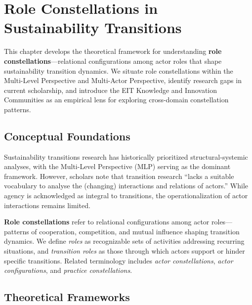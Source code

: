 \documentclass[../main.tex]{subfiles}
\begin{document}
\chapter{Role Constellations in Sustainability Transitions}
\margintoc

\begin{chapteroverview}
This chapter develops the theoretical framework for understanding \textbf{role constellations}---relational configurations among actor roles that shape sustainability transition dynamics. We situate role constellations within the Multi-Level Perspective and Multi-Actor Perspective, identify research gaps in current scholarship, and introduce the EIT Knowledge and Innovation Communities as an empirical lens for exploring cross-domain constellation patterns.
\end{chapteroverview}

\section{Conceptual Foundations}

Sustainability transitions research has historically prioritized structural-systemic analyses, with the Multi-Level Perspective (MLP) serving as the dominant framework. However, scholars note that transition research ``lacks a suitable vocabulary to analyse the (changing) interactions and relations of actors.'' While agency is acknowledged as integral to transitions, the operationalization of actor interactions remains limited.

\textbf{Role constellations} refer to relational configurations among actor roles---patterns of cooperation, competition, and mutual influence shaping transition dynamics. We define \textit{roles} as recognizable sets of activities addressing recurring situations, and \textit{transition roles} as those through which actors support or hinder specific transitions. Related terminology includes \textit{actor constellations}, \textit{actor configurations}, and \textit{practice constellations}.

\section{Theoretical Frameworks}
\end{document}
